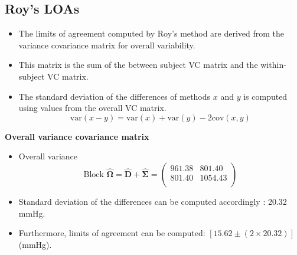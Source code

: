 \documentclass[compress]{beamer}        %
\makeatletter
\newcommand{\tcb}{\textcolor{beamer@blendedblue}}
\makeatother
\begin{document}
\subsection{Roy's LOAs}
\begin{frame}
\begin{itemize}
\item The limits of agreement computed by Roy's method are derived from the variance covariance matrix for overall variability.
\item This matrix is the sum of the between subject VC matrix and the within-subject VC matrix.
\item
The standard deviation of the differences of methods $x$ and $y$ is computed using values from the overall VC matrix.
\[
\mbox{var}(x - y ) = \mbox{var} ( x )  + \mbox{var} ( y ) - 2\mbox{cov} ( x ,y )
\]
\end{itemize}
\end{frame}
\begin{frame}[fragile]{\bf \tcb{Overall variance covariance matrix}}

\begin{itemize}\itemsep0.7cm
\item Overall variance \[
\mbox{Block }\hat{\boldsymbol{\Omega}} = \hat{\boldsymbol{D}} + \hat{\boldsymbol{\Sigma}} =
 \left(
\begin{array}{cc}
961.38 & 801.40 \\
801.40 & 1054.43 \\
\end{array}
\right)
\]

\item Standard deviation of the differences can be computed accordingly : 20.32 mmHg.

\item Furthermore, limits of agreement can be computed: $[15.62 \pm (2 \times 20.32) ]$ (mmHg).
\end{itemize}
\end{frame}
\end{document}
